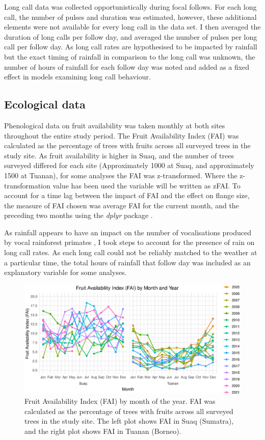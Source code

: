 Long call data was collected opportunistically during focal follows. For each long call, the number of pulses and duration was estimated, however, these additional elements were not available for every long call in the data set. I then averaged the duration of long calls per follow day, and averaged the number of pulses per long call per follow day. As long call rates are hypothesised to be impacted by rainfall but the exact timing of rainfall in comparison to the long call was unknown, the number of hours of rainfall for each follow day was noted and added as a fixed effect in models examining long call behaviour.

\subsection{Ecological data}
Phenological data on fruit availability was taken monthly at both sites throughout the entire study period. The Fruit Availability Index (FAI) was calculated as the percentage of trees with fruits across all surveyed trees in the study site. As fruit availability is higher in Suaq, and the number of trees surveyed differed for each site (Approximately 1000 at Suaq, and approximately 1500 at Tuanan),  for some analyses the FAI was z-transformed. Where the z-transformation value has been used the variable will be written as zFAI. To account for a time lag between the impact of FAI and the effect on flange size, the measure of FAI chosen was average FAI for the current month, and the preceding two months using the \textit{dplyr} package \citep{dplyr.2023}.

As rainfall appears to have an impact on the number of vocalisations produced by vocal rainforest primates \citep{Clink.2020, Kunz.2023}, I took steps to account for the presence of rain on long call rates. As each long call could not be reliably matched to the weather at a particular time, the total hours of rainfall that follow day was included as an explanatory variable for some analyses.

\begin{figure}
\centering
\includegraphics[width=1\linewidth]{Chapter3/Figs/plot.eps}
\caption{Fruit Availability Index (FAI) by month of the year. FAI was calculated as the percentage of trees with fruits across all surveyed trees in the study site. The left plot shows FAI in Suaq (Sumatra), and the right plot shows FAI in Tuanan (Borneo). }
\label{fig:FAI_by_month_between_Suaq_and_Tuanan}
\end{figure}

